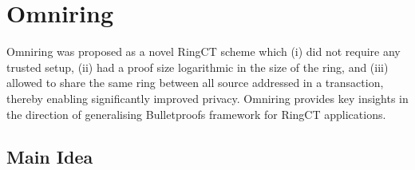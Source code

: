 \newpage
\section{Omniring}
\label{scn:omniring}

Omniring \cite{Lai2019} was proposed as a novel RingCT scheme which (i) did not require any trusted setup,
(ii) had a proof size logarithmic in the size of the ring, and (iii) allowed to share the same
ring between all source addressed in a transaction, thereby enabling significantly improved privacy.
Omniring provides key insights in the direction of generalising Bulletproofs \cite{Bunz2018} framework for RingCT applications.

\subsection{Main Idea}
\label{subscn:idea_omniring}

